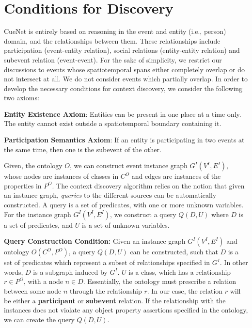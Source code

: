 \section{Conditions for Discovery}
CueNet is entirely based on reasoning in the event and entity (i.e., person) domain, and the relationships between them. These relationships include participation (event-entity relation), social relations (entity-entity relation) and subevent relation (event-event). For the sake of simplicity, we restrict our discussions to events whose spatiotemporal spans either completely overlap or do not intersect at all. We do not consider events which partially overlap. In order to develop the necessary conditions for context discovery, we consider the following two axioms:

\textbf{Entity Existence Axiom}: Entities can be present in one place at a time only. The entity cannot exist outside a spatiotemporal boundary containing it.

\textbf{Participation Semantics Axiom}: If an entity is participating in two events at the same time, then one is the subevent of the other. 


Given, the ontology $O$, we can construct event instance graph $G^I(V^I, E^I)$, whose nodes are instances of classes in $C^O$ and edges are instances of the properties in $P^O$. The context discovery algorithm relies on the notion that given an instance graph, \textit{queries} to the different sources can be automatically constructed. A query is a set of predicates, with one or more unknown variables. For the instance graph $G^I (V^I, E^I)$, we construct a query $Q(D, U)$ where $D$ is a set of predicates, and $U$ is a set of unknown variables.

\textbf{Query Construction Condition:} Given an instance graph $G^I (V^I, E^I)$ and ontology $O(C^O, P^O)$, a query $Q(D, U)$ can be constructed, such that $D$ is a set of predicates which represent a subset of relationships specified in $G^I$. In other words, $D$ is a subgraph induced by $G^I$. $U$ is a class, which has a relationship $r \in P^O$, with a node $n \in D$. Essentially, the ontology must prescribe a relation between some node $n$ through the relationship $r$. In our case, the relation $r$ will be either a \textbf{participant} or \textbf{subevent} relation. If the relationship with the instances does not violate any object property assertions specified in the ontology, we can create the query $Q(D, U)$.

